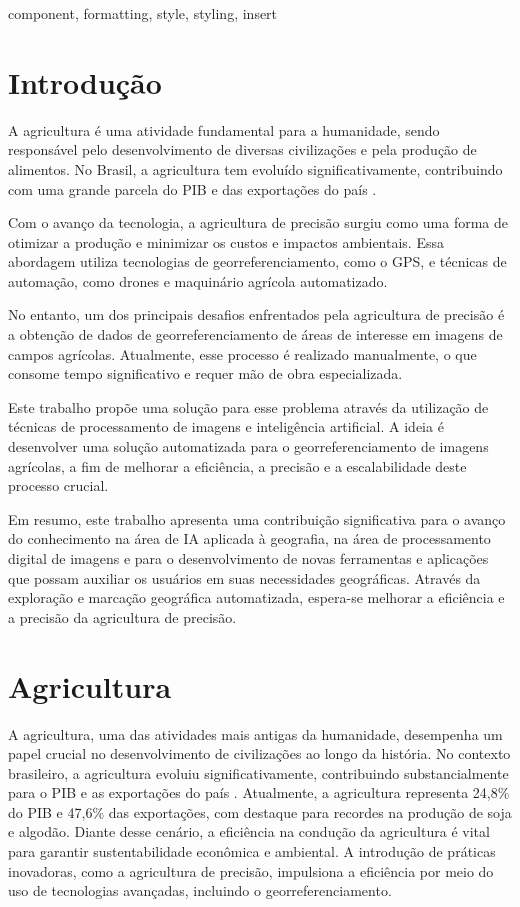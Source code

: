 \documentclass[conference]{IEEEtran}
\begin{document}
\begin{IEEEkeywords}
component, formatting, style, styling, insert
\end{IEEEkeywords}

\section{Introdução}

A agricultura é uma atividade fundamental para a humanidade, 
sendo responsável pelo desenvolvimento de diversas civilizações e pela produção de alimentos. 
No Brasil, a agricultura tem evoluído significativamente, contribuindo com uma grande parcela do PIB e 
das exportações do país \cite{embrapa2023}.

Com o avanço da tecnologia, a agricultura de precisão surgiu como uma forma de otimizar a produção e 
minimizar os custos e impactos ambientais. Essa abordagem utiliza tecnologias de georreferenciamento, como o GPS, 
e técnicas de automação, como drones e maquinário agrícola automatizado.

No entanto, um dos principais desafios enfrentados pela agricultura de precisão é a obtenção de dados de 
georreferenciamento de áreas de interesse em imagens de campos agrícolas. 
Atualmente, esse processo é realizado manualmente, 
o que consome tempo significativo e requer mão de obra especializada.

Este trabalho propõe uma solução para esse problema através da utilização de técnicas de 
processamento de imagens e inteligência artificial. A ideia é desenvolver uma solução automatizada para o 
georreferenciamento de imagens agrícolas, a fim de melhorar a eficiência, a precisão e a escalabilidade deste 
processo crucial.

Em resumo, este trabalho apresenta uma contribuição significativa para o avanço do conhecimento na área de IA 
aplicada à geografia, na área de processamento digital de imagens e para o desenvolvimento de novas ferramentas 
e aplicações que possam auxiliar os usuários 
em suas necessidades geográficas. Através da exploração e marcação geográfica automatizada, espera-se melhorar 
a eficiência e a precisão da agricultura de precisão.

\section{Agricultura}

A agricultura, uma das atividades mais antigas da humanidade, desempenha um papel crucial no 
desenvolvimento de civilizações ao longo da história. No contexto brasileiro, a agricultura evoluiu 
significativamente, contribuindo substancialmente para o PIB e as exportações do país \cite{embrapa2023}. Atualmente, a agricultura representa 24,8\% do PIB e 47,6\% das exportações, com destaque para recordes na produção de soja e algodão. Diante desse cenário, a eficiência na condução da agricultura é vital para garantir sustentabilidade econômica e ambiental. A introdução de práticas inovadoras, como a agricultura de precisão, impulsiona a eficiência por meio do uso de tecnologias avançadas, incluindo o georreferenciamento.
\end{document}
